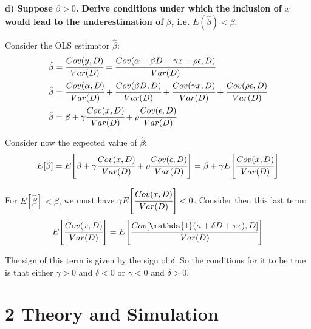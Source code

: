 \documentclass[a4paper,12pt,oneside,English]{article}
\begin{document}
\textbf{d) Suppose }$\beta > 0$\textbf{. Derive conditions under which the inclusion of $x$ would lead to the underestimation of} $\beta$\textbf{, i.e.} $E(\hat\beta) < \beta$.

Consider the OLS estimator $\hat\beta$:
\begin{equation}
\begin{split}
\hat\beta&=\cfrac{Cov(y,D)}{Var(D)}=\cfrac{Cov(\alpha+\beta D + \gamma x + \rho \epsilon,D)}{Var(D)}\\
\hat\beta&=\cfrac{Cov(\alpha,D)}{Var(D)}+\cfrac{Cov(\beta D,D)}{Var(D)}+\cfrac{Cov(\gamma x,D)}{Var(D)}+\cfrac{Cov(\rho\epsilon,D)}{Var(D)}\\
\hat\beta&=\beta+\gamma\cfrac{Cov(x,D)}{Var(D)}+\rho\cfrac{Cov(\epsilon,D)}{Var(D)}
\end{split}
\end{equation}

Consider now the expected value of $\hat\beta$:
\begin{equation}
E[\hat\beta]=E\Biggl[\beta+\gamma\cfrac{Cov(x,D)}{Var(D)}+\rho\cfrac{Cov(\epsilon,D)}{Var(D)}\Biggr]=\beta + \gamma E\Biggl[\cfrac{Cov(x,D)}{Var(D)}\Biggr]   
\end{equation}

For $E[\hat\beta]<\beta$, we must have $\gamma E\Biggl[\cfrac{Cov(x,D)}{Var(D)}\Biggr]<0$. Consider then this last term:
\begin{equation}
    E\Biggl[\cfrac{Cov(x,D)}{Var(D)}\Biggr]=E\Biggl[\cfrac{Cov[\mathds{1}(\kappa+\delta D+\pi \epsilon),D]}{Var(D)}\Biggr]
\end{equation}

The sign of this term is given by the sign of $\delta$. So the conditions for it to be true is that either $\gamma>0$ and $\delta<0$ or $\gamma<0$ and $\delta>0$.

\newpage
\section{2 Theory and Simulation}
\end{document}
